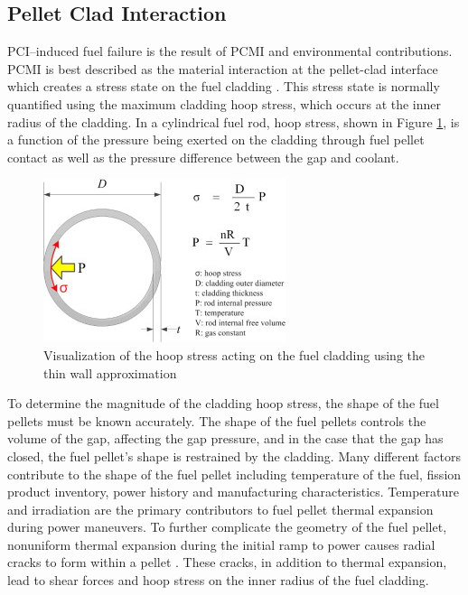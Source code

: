 \documentclass[edeposit,fullpage,11pt]{uiucthesis2009}
\begin{document}
\subsection{Pellet Clad Interaction}

\gls{PCI}--induced fuel failure is the result of \gls{PCMI} and environmental contributions.
\gls{PCMI} is best described as the material interaction at the pellet-clad interface which creates a stress state on the fuel cladding \cite{kennard_pci_2016}.
This stress state is normally quantified using the maximum cladding hoop stress, which occurs at the inner radius of the cladding.
In a cylindrical fuel rod, hoop stress, shown in Figure \ref{fig:hoop_stress_cite}, is a function of the pressure being exerted on the cladding through fuel pellet contact as well as the pressure difference between the gap and coolant.

\begin{figure}
\begin{center}
\includegraphics[width=0.5\linewidth]{./Figures/hoop_stress_cite.jpg}
\caption{Visualization of the hoop stress acting on the fuel cladding using the thin wall approximation \cite{kook_review_2013}}
\label{fig:hoop_stress_cite}
\end{center}
\end{figure}

To determine the magnitude of the cladding hoop stress, the shape of the fuel pellets must be known accurately.
The shape of the fuel pellets controls the volume of the gap, affecting the gap pressure, and in the case that the gap has closed, the fuel pellet's shape is restrained by the cladding. 
Many different factors contribute to the shape of the fuel pellet including temperature of the fuel, fission product inventory, power history and manufacturing characteristics.
Temperature and irradiation are the primary contributors to fuel pellet thermal expansion during power maneuvers.
To further complicate the geometry of the fuel pellet, nonuniform thermal expansion during the initial ramp to power causes radial cracks to form within a pellet \cite{capps_evaluation_2016}.
These cracks, in addition to thermal expansion, lead to shear forces and hoop stress on the inner radius of the fuel cladding.
  
\end{document}
